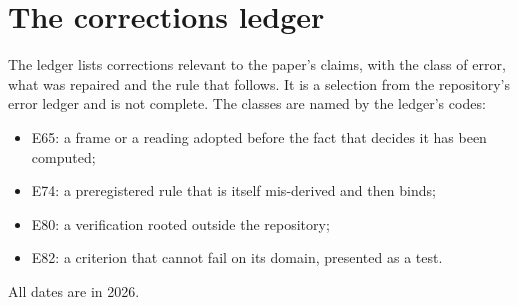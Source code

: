 \section{The corrections ledger}\label{app:corrections}

The ledger lists corrections relevant to the paper's claims, with the class of error, what was repaired and the rule that
follows. It is a selection from the repository's error ledger and is not complete. The classes are named by the ledger's
codes:
\begin{itemize}
\item E65: a frame or a reading adopted before the fact that decides it has been computed;
\item E74: a preregistered rule that is itself mis-derived and then binds;
\item E80: a verification rooted outside the repository;
\item E82: a criterion that cannot fail on its domain, presented as a test.
\end{itemize}
All dates are in 2026.

